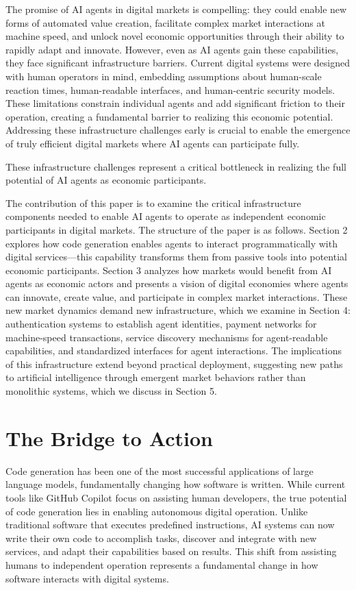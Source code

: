 \documentclass{article}
\begin{document}
The promise of AI agents in digital markets is compelling: they could enable new forms of automated value creation, facilitate complex market interactions at machine speed, and unlock novel economic opportunities through their ability to rapidly adapt and innovate. However, even as AI agents gain these capabilities, they face significant infrastructure barriers. Current digital systems were designed with human operators in mind, embedding assumptions about human-scale reaction times, human-readable interfaces, and human-centric security models. These limitations constrain individual agents and add significant friction to their operation, creating a fundamental barrier to realizing this economic potential. Addressing these infrastructure challenges early is crucial to enable the emergence of truly efficient digital markets where AI agents can participate fully.

These infrastructure challenges represent a critical bottleneck in realizing the full potential of AI agents as economic participants.

The contribution of this paper is to examine the critical infrastructure components needed to enable AI agents to operate as independent economic participants in digital markets. The structure of the paper is as follows. Section 2 explores how code generation enables agents to interact programmatically with digital services—this capability transforms them from passive tools into potential economic participants. Section 3 analyzes how markets would benefit from AI agents as economic actors and presents a vision of digital economies where agents can innovate, create value, and participate in complex market interactions. These new market dynamics demand new infrastructure, which we examine in Section 4: authentication systems to establish agent identities, payment networks for machine-speed transactions, service discovery mechanisms for agent-readable capabilities, and standardized interfaces for agent interactions. The implications of this infrastructure extend beyond practical deployment, suggesting new paths to artificial intelligence through emergent market behaviors rather than monolithic systems, which we discuss in Section 5.

\section{The Bridge to Action}
Code generation has been one of the most successful applications of large language models, fundamentally changing how software is written\cite{li2022automatingcodereviewactivities}\cite{replit2024agent}\cite{cursor}\cite{windsurf}. While current tools like GitHub Copilot\cite{copilot} focus on assisting human developers, the true potential of code generation lies in enabling autonomous digital operation. Unlike traditional software that executes predefined instructions, AI systems can now write their own code to accomplish tasks, discover and integrate with new services, and adapt their capabilities based on results\cite{voyager}\cite{zhu2023ghost}. This shift from assisting humans to independent operation represents a fundamental change in how software interacts with digital systems.
\end{document}
